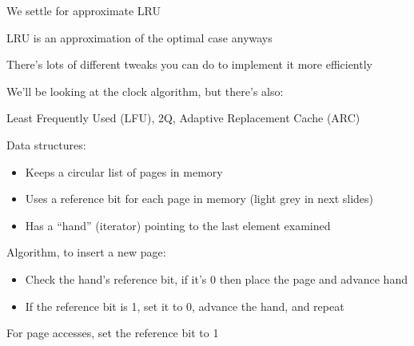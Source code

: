 \begin{slide}


    We settle for approximate LRU

    \leftspace{}LRU is an approximation of the optimal case anyways
    \medskip

    There's lots of different tweaks you can do to implement it more efficiently
    \medskip

    We'll be looking at the clock algorithm, but there's also:

    \leftspace{}Least Frequently Used (LFU), 2Q, Adaptive Replacement Cache (ARC)

\end{slide}

\begin{slide}


    Data structures:
    \begin{itemize}
      \item Keeps a circular list of pages in memory
      \item Uses a reference bit for each page in memory (light grey in next slides)
      \item Has a ``hand'' (iterator) pointing to the last element examined
    \end{itemize}
    \medskip

    Algorithm, to insert a new page:
    \begin{itemize}
      \item Check the hand's reference bit, if it's 0 then place the page and advance hand
      \item If the reference bit is 1, set it to 0, advance the hand, and repeat
    \end{itemize}
    \medskip

    For page accesses, set the reference bit to 1

\end{slide}

